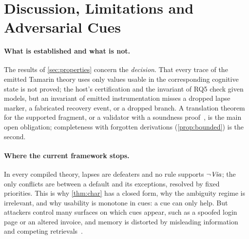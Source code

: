 \section{Discussion, Limitations and Adversarial Cues}
\label{sec:discussion}

\paragraph{What is established and what is not.} The results of \cref{sec:properties} concern the \emph{decision}. That every trace of the emitted Tamarin theory uses only values usable in the corresponding cognitive state is not proved; the host's certification and the invariant of RQ5 check given models, but an invariant of emitted instrumentation misses a dropped lapse marker, a fabricated recovery event, or a dropped branch. A translation theorem for the supported fragment, or a validator with a soundness proof~\cite{pnueli1998translation}, is the main open obligation; completeness with forgotten derivations (\cref{prop:bounded}) is the second.

\paragraph{Where the current framework stops.} In every compiled theory, lapses are defeaters and no rule supports $\neg\mathit{Via}$; the only conflicts are between a default and its exceptions, resolved by fixed priorities. This is why \cref{thm:char} has a closed form, why the ambiguity regime is irrelevant, and why usability is monotone in cues: a cue can only help. But attackers control many surfaces on which cues appear, such as a spoofed login page or an altered invoice, and memory is distorted by misleading information~\cite{loftus2005planting} and competing retrievals~\cite{anderson1994remembering}.

